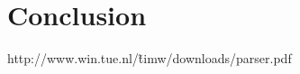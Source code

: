 \documentclass[10pt,a4paper]{article}
\begin{document}
\section{Conclusion}\label{conc}


\begin{thebibliography}{9}

 http://www.win.tue.nl/\~timw/downloads/parser.pdf

\end{thebibliography}


\begin{comment}
A picture of the labelled transition system.

\begin{tikzpicture}[->,>=stealth', shorten >=1pt,auto, node distance=2.8cm, semithick]
  \tikzstyle{every state}=[text=black]

  \node[initial,state] (0)                    {$0$};
  \node[state]         (1) [right of=0] {$1$};
  \node[state]         (2) [below of=0] {$2$};
  \node[state]         (3) [right of=1] {$3$};
  \node[state]         (4) [below of=1] {$4$};
  \node[state]         (5) [below of=2] {$5$};
  \node[state]         (6) [right of=4] {$6$};
  \node[state]         (7) [below of=4] {$7$};
  
 \path (0) edge node {$\tau$} (1)
 	   (0) edge node {$\tau$} (2)
 	   (1) edge node {$\tau$} (3)
 	   (1) edge node {$\tau$} (4)
 	   (2) edge node {$\tau$} (5)
 	   (2) edge node {$\tau$} (4)
 	   (3) edge node {$a$} 	  (6)
 	   (3) edge [bend right] node {$b$} 	  (0)
 	   (4) edge node {$\tau$} (6)
 	   (4) edge node {$\tau$} (7)
 	   (5) edge [bend left] node {$a$}    (0)
 	   (5) edge node {$a$}    (7)
 	   (6) edge [bend right] node {$\tau$} (2)
 	   (7) edge [bend right] node {$b$}    (1);
\end{tikzpicture}
\end{comment}
\end{document}
